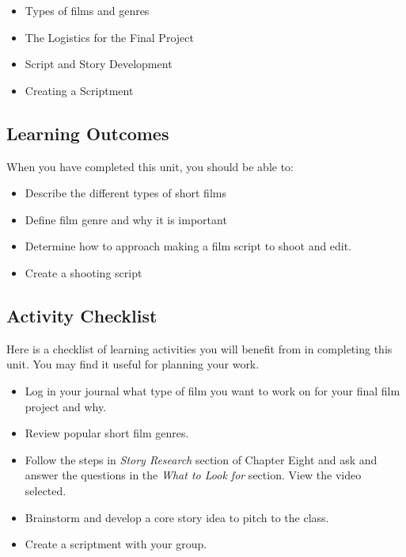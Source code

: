 \documentclass[
]{book}
\providecommand{\tightlist}{%
  \setlength{\itemsep}{0pt}\setlength{\parskip}{0pt}}
\begin{document}
\begin{itemize}
\tightlist
\item
  Types of films and genres
\item
  The Logistics for the Final Project\\
\item
  Script and Story Development\\
\item
  Creating a Scriptment
\end{itemize}

\hypertarget{learning-outcomes-7}{%
\subsection*{Learning Outcomes}\label{learning-outcomes-7}}

When you have completed this unit, you should be able to:

\begin{itemize}
\tightlist
\item
  Describe the different types of short films\\
\item
  Define film genre and why it is important\\
\item
  Determine how to approach making a film script to shoot and edit.\\
\item
  Create a shooting script
\end{itemize}

\hypertarget{activity-checklist-7}{%
\subsection*{Activity Checklist}\label{activity-checklist-7}}

\begin{reflect}
Here is a checklist of learning activities you will benefit from in completing this unit. You may find it useful for planning your work.

\begin{itemize}
\tightlist
\item
  Log in your journal what type of film you want to work on for your final film project and why.
\item
  Review popular short film genres.
\item
  Follow the steps in \emph{Story Research} section of Chapter Eight and ask and answer the questions in the \emph{What to Look for} section. View the video selected.
\item
  Brainstorm and develop a core story idea to pitch to the class.
\item
  Create a scriptment with your group.
\end{itemize}
\end{reflect}
\end{document}
